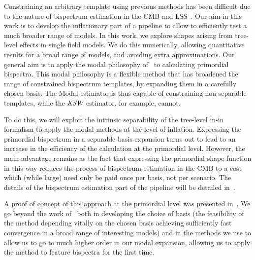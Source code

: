 Constraining an arbitrary template using previous methods has been difficult
due to the nature of bispectrum estimation in the CMB and
LSS~\cite{lss_baldauf,lss_karagiannis,chen_future_lss,Scoccimarro_2012}.
Our aim in this work is to develop the inflationary part
of a pipeline to allow to efficiently test a much broader range of models.
In this work, we explore shapes arising from tree-level effects in single field models.
We do this numerically, allowing quantitative results for a broad
range of models, and avoiding extra approximations.
Our general aim is to apply the modal philosophy of~\cite{FergShell_1,FergShell_2,FergShell_3}
to calculating primordial bispectra.
This modal philosophy is a flexible method that has broadened the range of constrained
bispectrum templates, by expanding them in a carefully chosen basis.
The Modal estimator is thus capable of constraining
non-separable templates, while the ${\textit{\text{KSW}}}$ estimator, for example, cannot.


To do this, we will exploit the intrinsic separability of the
tree-level in-in formalism to apply the modal methods at the level of inflation.
Expressing the primordial bispectrum in a separable
basis expansion turns out to lead to an increase in the efficiency
of the calculation at the primordial level.
However, the main advantage remains as the fact that
expressing the primordial shape function
in this way reduces the process of bispectrum estimation in the CMB to a
cost which (while large) need only be paid once per basis,
not per scenario.
The details of the bispectrum estimation part of
the pipeline will be detailed in~\cite{Sohn_2021}.


A proof of concept of this approach at the primordial level was presented in~\cite{Funakoshi}.
We go beyond the work of~\cite{Funakoshi} both in developing the choice of basis
(the feasibility of the method depending vitally on the chosen basis
achieving sufficiently fast convergence in a broad range of interesting models)
and in the methods we use to allow us to go to much higher order in our modal expansion,
allowing us to apply the method to feature bispectra for the first time.




